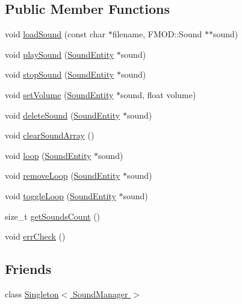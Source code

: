 \subsection*{Public Member Functions}
\begin{DoxyCompactItemize}
\item 
void \hyperlink{class_symp_1_1_sound_manager_a972352cbe24f1c8b0d7565947bb7a57c}{load\-Sound} (const char $\ast$filename, F\-M\-O\-D\-::\-Sound $\ast$$\ast$sound)
\item 
void \hyperlink{class_symp_1_1_sound_manager_ac2468cc62d82609a0b40c0fc762e41ad}{play\-Sound} (\hyperlink{class_symp_1_1_sound_entity}{Sound\-Entity} $\ast$sound)
\item 
void \hyperlink{class_symp_1_1_sound_manager_a8c9c583fca013bd40de6727dd9e73f8f}{stop\-Sound} (\hyperlink{class_symp_1_1_sound_entity}{Sound\-Entity} $\ast$sound)
\item 
void \hyperlink{class_symp_1_1_sound_manager_af34876657adc807356d0de9afda2b3e9}{set\-Volume} (\hyperlink{class_symp_1_1_sound_entity}{Sound\-Entity} $\ast$sound, float volume)
\item 
void \hyperlink{class_symp_1_1_sound_manager_a698683e6aba812834d9a9e08cadd2587}{delete\-Sound} (\hyperlink{class_symp_1_1_sound_entity}{Sound\-Entity} $\ast$sound)
\item 
void \hyperlink{class_symp_1_1_sound_manager_af80ac26864c4c5ce194ba9a83c8c77eb}{clear\-Sound\-Array} ()
\item 
void \hyperlink{class_symp_1_1_sound_manager_a7f80b283b003d17f63e3a456f1a7c595}{loop} (\hyperlink{class_symp_1_1_sound_entity}{Sound\-Entity} $\ast$sound)
\item 
void \hyperlink{class_symp_1_1_sound_manager_a57f819ab0ef3f5afabe93f79fdedf9b7}{remove\-Loop} (\hyperlink{class_symp_1_1_sound_entity}{Sound\-Entity} $\ast$sound)
\item 
void \hyperlink{class_symp_1_1_sound_manager_a69c7f20fb91625fb90e9930bf1df5832}{toggle\-Loop} (\hyperlink{class_symp_1_1_sound_entity}{Sound\-Entity} $\ast$sound)
\item 
size\-\_\-t \hyperlink{class_symp_1_1_sound_manager_ab96e94d7739ae86a580417fc19a88037}{get\-Sounds\-Count} ()
\item 
void \hyperlink{class_symp_1_1_sound_manager_aa82b83dfbd0b594da8373304e9b414ce}{err\-Check} ()
\end{DoxyCompactItemize}
\subsection*{Friends}
\begin{DoxyCompactItemize}
\item 
class \hyperlink{class_symp_1_1_sound_manager_a0caa66cbb01357370233dc2bd5fdb585}{Singleton$<$ Sound\-Manager $>$}
\end{DoxyCompactItemize}
